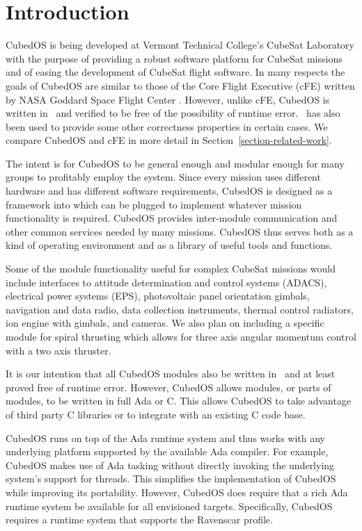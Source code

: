 
\section{Introduction}

CubedOS is being developed at Vermont Technical College's CubeSat Laboratory with the purpose of
providing a robust software platform for CubeSat missions and of easing the development of
CubeSat flight software. In many respects the goals of CubedOS are similar to those of the Core
Flight Executive (cFE) written by NASA Goddard Space Flight Center \cite{cFE}. However, unlike
cFE, CubedOS is written in \SPARK\ and verified to be free of the possibility of runtime error.
\SPARK\ has also been used to provide some other correctness properties in certain cases. We
compare CubedOS and cFE in more detail in Section~\ref{section-related-work}.

The intent is for CubedOS to be general enough and modular enough for many groups to profitably
employ the system. Since every mission uses different hardware and has different software
requirements, CubedOS is designed as a framework into which  can be plugged to
implement whatever mission functionality is required. CubedOS provides inter-module
communication and other common services needed by many missions. CubedOS thus serves both as a
kind of operating environment and as a library of useful tools and functions.

Some of the module functionality useful for complex CubeSat missions would include interfaces to
 attitude determination and control systems (ADACS), electrical power systems (EPS), photovoltaic
 panel orientation gimbals, navigation and data radio, data collection instruments, thermal control
 radiators, ion engine with gimbals, and cameras. We also plan on including a specific module for
 spiral thrusting which allows for three axis angular momentum control with a two axis thruster.

It is our intention that all CubedOS modules also be written in \SPARK\ and at least proved free
of runtime error. However, CubedOS allows modules, or parts of modules, to be written in full
Ada or C. This allows CubedOS to take advantage of third party C libraries or to integrate with
an existing C code base.

CubedOS runs on top of the Ada runtime system and thus works with any underlying platform
supported by the available Ada compiler. For example, CubedOS makes use of Ada tasking without
directly invoking the underlying system's support for threads. This simplifies the
implementation of CubedOS while improving its portability. However, CubedOS does require that a
rich Ada runtime system be available for all envisioned targets. Specifically, CubedOS requires
a runtime system that supports the Ravenscar profile.

